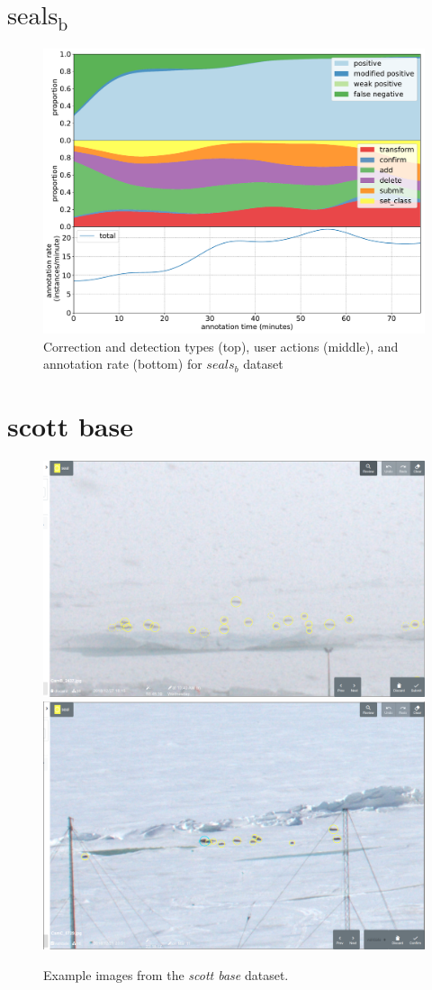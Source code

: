 \section {\texorpdfstring{$\mathrm{seals_b}$}{}}
\label{sec:seals2_details}

\begin{figure}[!h]
\centering
\includegraphics[width=1.0\linewidth]{charts/action_annotations/seals2.pdf}
\caption{ Correction and detection types (top), user actions (middle), and annotation rate (bottom) for $seals_b$ dataset }
\label{fig:seals2_annotation}
\end{figure}

\pagebreak
\section {scott base}
\label{sec:scott_base_details}


\begin{figure}[!h]
\centering
  \includegraphics[width=0.475\linewidth]{figures/annotation/screenshots/scott_base_storm.png}
  \hfill
  \includegraphics[width=0.45\linewidth]{figures/annotation/screenshots/scott_base_sunny.png}
  \caption{}
\caption{ Example images from the \emph{scott base} dataset.}
\label {fig:scott_base_examples}
\end{figure}

